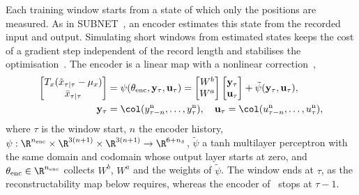 Each training window starts from a state of which only the positions are
measured.
As in SUBNET~\cite{beintema2023subnet}, an encoder estimates this state from
the recorded input and output.
Simulating short windows from estimated states keeps the cost of a gradient
step independent of the record length and stabilises the
optimisation~\cite[Secs.~2, 3]{beintema2023subnet}.
The encoder is a linear map with a nonlinear
correction~\cite[Eq.~(8)]{hoekstra2026encoder},
\begin{equation}
\begin{aligned}
 \begin{bmatrix}T_x(\tilde x_{\tau|\tau}-\mu_x)\\ \bar x_{\tau|\tau}\end{bmatrix}
 &=\psi(\theta_{\mathrm{enc}},\mathbf y_\tau,\mathbf u_\tau)
 =\begin{bmatrix}W^b\\ W^a\end{bmatrix}
 \begin{bmatrix}\mathbf y_\tau\\ \mathbf u_\tau\end{bmatrix}
 +\tilde\psi(\mathbf y_\tau,\mathbf u_\tau),\\
 \mathbf y_\tau&=\col(y^{\mathrm n}_{\tau-n},\dots,y^{\mathrm n}_\tau),\quad
 \mathbf u_\tau=\col(u^{\mathrm n}_{\tau-n},\dots,u^{\mathrm n}_\tau),
\end{aligned}
\label{eq:aug_encoder}
\end{equation}
where $\tau$ is the window start, $n$ the encoder history,
$\psi:\R^{n_{\mathrm{enc}}}\times\R^{3(n+1)}\times\R^{3(n+1)}\to\R^{6+n_{\bar x}}$,
$\tilde\psi$ a tanh multilayer perceptron with the same domain and codomain
whose output layer starts at zero,
and $\theta_{\mathrm{enc}}\in\R^{n_{\mathrm{enc}}}$ collects $W^b$, $W^a$ and
the weights of $\tilde\psi$.
The window ends at $\tau$, as the reconstructability map below requires,
whereas the encoder of~\cite[Eq.~(22e)]{hoekstra2026lfr} stops at $\tau-1$.

